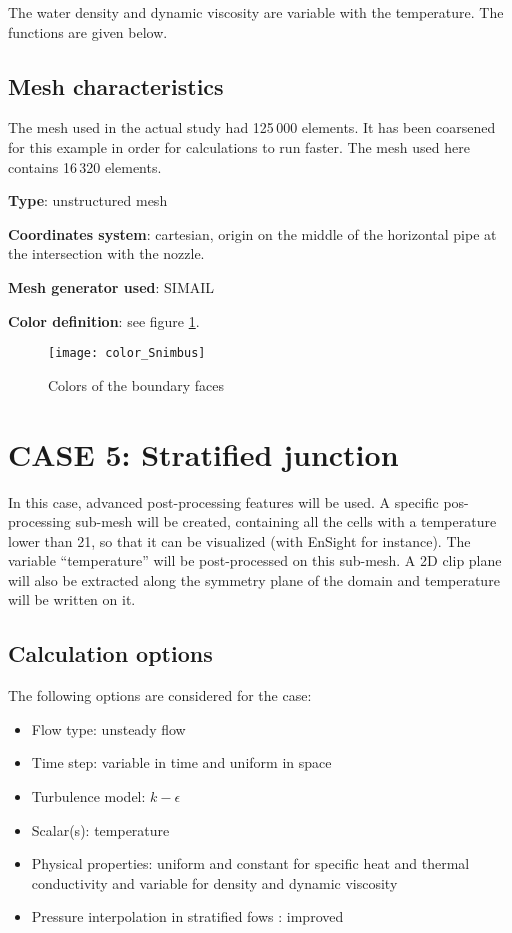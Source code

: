 The water density and dynamic viscosity are variable with the temperature. The
functions are given below.


        \subsection{Mesh characteristics}
The mesh used in the actual study had 125\,000 elements. It has been coarsened
for this example in order for calculations to run faster. The mesh used here
contains 16\,320 elements.

{\bfseries Type}: unstructured mesh

{\bfseries Coordinates system}: cartesian, origin on the middle of the horizontal pipe at the intersection with the nozzle.

{\bfseries Mesh generator used}: SIMAIL

{\bfseries Color definition}: see figure \ref{fige1_e5}.

\begin{figure}[h!]
\begin{center}
\texttt{[image: color\_Snimbus]}
\caption{Colors of the boundary faces}
\label{fige1_e5}
\end{center}
\end{figure}


\section{CASE 5: Stratified junction}
In this case, advanced post-processing features will be used. A specific
pos-processing sub-mesh will be created, containing all the cells with a
temperature lower than 21\degresC, so that it can be visualized (with EnSight
for instance). The variable ``temperature'' will be post-processed on this
sub-mesh. A 2D clip plane will also be extracted along the symmetry plane of the
domain and temperature will be written on it.


        \subsection{Calculation options}

The following options are considered for the case:
\begin{itemize}
\renewcommand{\labelitemi}{$\rightarrow$}
        \item Flow type: unsteady flow
        \item Time step: variable in time and uniform in space
        \item Turbulence model: $k-\epsilon$
        \item Scalar(s): temperature
        \item Physical properties: uniform and constant for specific heat and
thermal conductivity and variable for density and dynamic viscosity
        \item Pressure interpolation in stratified fows : improved
\end{itemize}


